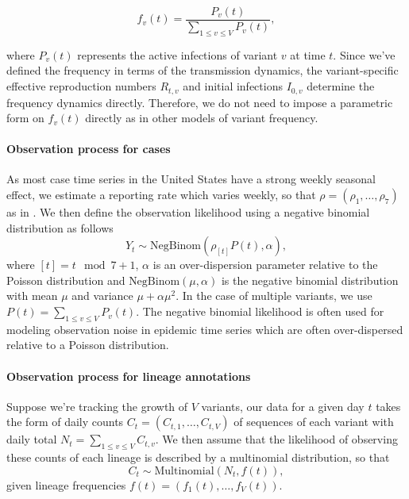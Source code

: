 \documentclass[12pt]{article}
\begin{document}
\begin{equation}
  f_{v}(t) = \frac{P_{v}(t)}{ \sum_{1\leq v \leq V} P_{v}(t)},
\end{equation}

where $P_{v}(t)$ represents the active infections of variant $v$ at time $t$.
Since we've defined the frequency in terms of the transmission dynamics, the variant-specific effective reproduction numbers $R_{t,v}$ and initial infections $I_{0, v}$ determine the frequency dynamics directly.
Therefore, we do not need to impose a parametric form on $f_{v}(t)$ directly as in other models of variant frequency.

\paragraph{Observation process for cases}%

As most case time series in the United States have a strong weekly seasonal effect, we estimate a reporting rate which varies weekly, so that $\rho = (\rho_{1}, \ldots, \rho_{7})$ as in \cite{Abbott2020}.
We then define the observation likelihood using a negative binomial distribution as follows
\begin{equation}
  Y_{t} \sim \text{NegBinom}(\rho_{[t]} P(t),  \alpha),
\end{equation}
where $[t] = t \mod 7 + 1$, $\alpha$ is an over-dispersion parameter relative to the Poisson distribution and $\text{NegBinom}(\mu, \alpha)$ is the negative binomial distribution with mean $\mu$ and variance  $\mu + \alpha\mu^{2}$. In the case of multiple variants, we use $P(t) = \sum_{1\leq v \leq V} P_{v}(t)$.
The negative binomial likelihood is often used for modeling observation noise in epidemic time series which are often over-dispersed relative to a Poisson distribution. %

\paragraph{Observation process for lineage annotations}%

Suppose we're tracking the growth of $V$ variants, our data for a given day $t$ takes the form of daily counts $C_{t} = (C_{t,1}, \ldots, C_{t,V})$ of sequences of each variant with daily total $N_{t} = \sum_{1\leq v \leq V} C_{t, v}$.
We then assume that the likelihood of observing these counts of each lineage is described by a multinomial distribution, so that
\begin{equation}
    C_{t} \sim \text{Multinomial}(N_{t}, f(t)),
\end{equation}
given lineage frequencies $f(t) = (f_{1}(t), \ldots, f_{V}(t))$.
\end{document}
